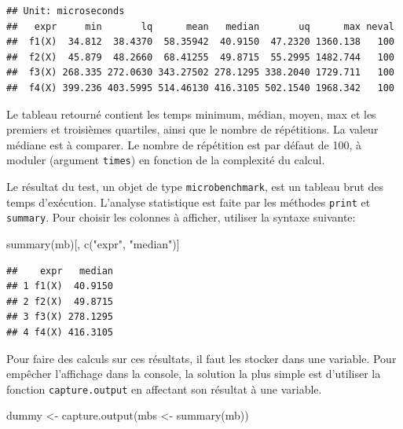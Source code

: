 \documentclass[
  11pt,
  french,
  a4paper,
  extrafontsizes,onecolumn,openright
  ]{memoir}
\newenvironment{Shaded}{\begin{snugshade}}{\end{snugshade}}
\newcommand{\FunctionTok}[1]{\textcolor[rgb]{0.00,0.00,0.00}{#1}}
\newcommand{\NormalTok}[1]{#1}
\newcommand{\OtherTok}[1]{\textcolor[rgb]{0.56,0.35,0.01}{#1}}
\newcommand{\StringTok}[1]{\textcolor[rgb]{0.31,0.60,0.02}{#1}}
\begin{document}
\begin{verbatim}
## Unit: microseconds
##   expr     min       lq      mean   median       uq      max neval
##  f1(X)  34.812  38.4370  58.35942  40.9150  47.2320 1360.138   100
##  f2(X)  45.879  48.2660  68.41255  49.8715  55.2995 1482.744   100
##  f3(X) 268.335 272.0630 343.27502 278.1295 338.2040 1729.711   100
##  f4(X) 399.236 403.5995 514.46130 416.3105 502.1540 1968.342   100
\end{verbatim}

\normalsize

Le tableau retourné contient les temps minimum, médian, moyen, max et les premiers et troisièmes quartiles, ainsi que le nombre de répétitions.
La valeur médiane est à comparer.
Le nombre de répétition est par défaut de 100, à moduler (argument \texttt{times}) en fonction de la complexité du calcul.

Le résultat du test, un objet de type \texttt{microbenchmark}, est un tableau brut des temps d'exécution.
L'analyse statistique est faite par les méthodes \texttt{print} et \texttt{summary}.
Pour choisir les colonnes à afficher, utiliser la syntaxe suivante:

\scriptsize

\begin{Shaded}
\begin{Highlighting}[]
\FunctionTok{summary}\NormalTok{(mb)[, }\FunctionTok{c}\NormalTok{(}\StringTok{"expr"}\NormalTok{, }\StringTok{"median"}\NormalTok{)]}
\end{Highlighting}
\end{Shaded}

\begin{verbatim}
##    expr   median
## 1 f1(X)  40.9150
## 2 f2(X)  49.8715
## 3 f3(X) 278.1295
## 4 f4(X) 416.3105
\end{verbatim}

\normalsize

Pour faire des calculs sur ces résultats, il faut les stocker dans une variable.
Pour empêcher l'affichage dans la console, la solution la plus simple est d'utiliser la fonction \texttt{capture.output} en affectant son résultat à une variable.

\scriptsize

\begin{Shaded}
\begin{Highlighting}[]
\NormalTok{dummy }\OtherTok{\textless{}{-}} \FunctionTok{capture.output}\NormalTok{(mbs }\OtherTok{\textless{}{-}} \FunctionTok{summary}\NormalTok{(mb))}
\end{Highlighting}
\end{Shaded}
\end{document}
